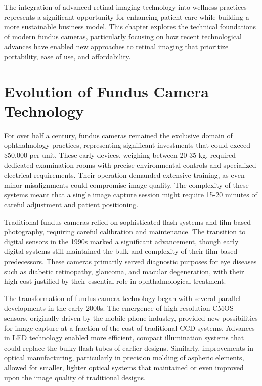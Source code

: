 \documentclass[
  Letterpaper,
]{scrbook}
\begin{document}
The integration of advanced retinal imaging technology into wellness
practices represents a significant opportunity for enhancing patient
care while building a more sustainable business model. This chapter
explores the technical foundations of modern fundus cameras,
particularly focusing on how recent technological advances have enabled
new approaches to retinal imaging that prioritize portability, ease of
use, and affordability.

\section{Evolution of Fundus Camera
Technology}\label{evolution-of-fundus-camera-technology}

For over half a century, fundus cameras remained the exclusive domain of
ophthalmology practices, representing significant investments that could
exceed \$50,000 per unit. These early devices, weighing between 20-35
kg, required dedicated examination rooms with precise environmental
controls and specialized electrical requirements. Their operation
demanded extensive training, as even minor misalignments could
compromise image quality. The complexity of these systems meant that a
single image capture session might require 15-20 minutes of careful
adjustment and patient positioning.

Traditional fundus cameras relied on sophisticated flash systems and
film-based photography, requiring careful calibration and maintenance.
The transition to digital sensors in the 1990s marked a significant
advancement, though early digital systems still maintained the bulk and
complexity of their film-based predecessors. These cameras primarily
served diagnostic purposes for eye diseases such as diabetic
retinopathy, glaucoma, and macular degeneration, with their high cost
justified by their essential role in ophthalmological treatment.

The transformation of fundus camera technology began with several
parallel developments in the early 2000s. The emergence of
high-resolution CMOS sensors, originally driven by the mobile phone
industry, provided new possibilities for image capture at a fraction of
the cost of traditional CCD systems. Advances in LED technology enabled
more efficient, compact illumination systems that could replace the
bulky flash tubes of earlier designs. Similarly, improvements in optical
manufacturing, particularly in precision molding of aspheric elements,
allowed for smaller, lighter optical systems that maintained or even
improved upon the image quality of traditional designs.
\end{document}
